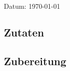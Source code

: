 \documentclass[fontsize=15pt,paper=a4]{scrdoc}
\begin{document}
\section*{}
\vspace{-15pt}
\begin{center}
    \scriptsize Datum: \today
\end{center}

\subsection*{Zutaten}
\begin{multicols}{2}
    \begin{itemize}[left=0pt, label={-}, itemsep=-0.15em]
        
    \end{itemize}
\end{multicols}

\subsection*{Zubereitung}
\begin{enumerate}[left=0pt]
    
\end{enumerate}
\end{document}
